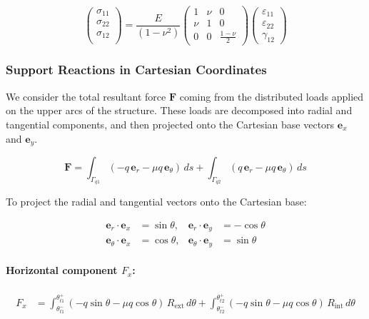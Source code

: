\documentclass[12pt]{article}
\begin{document}
\begin{equation}
    \begin{pmatrix}
    \sigma_{11} \\
    \sigma_{22} \\
    \sigma_{12} \\
    \end{pmatrix}= \frac{E}{(1-\nu^2)}\begin{pmatrix}
    1 &  \nu & 0  \\
    \nu & 1 & 0 \\
    0 & 0 & \frac{1-\nu}{2} 
    \end{pmatrix}
    \begin{pmatrix}
    \varepsilon_{11} \\
    \varepsilon_{22} \\
    \gamma_{12}
    \end{pmatrix}
\end{equation}


\subsubsection{Support Reactions in Cartesian Coordinates}

We consider the total resultant force $\mathbf{F}$ coming from the distributed loads applied on the upper arcs of the structure. These loads are decomposed into radial and tangential components, and then projected onto the Cartesian base vectors $\mathbf{e}_x$ and $\mathbf{e}_y$.

\begin{equation}
\boxed{
\mathbf{F} =
\int_{\Gamma_{q1}} (-q\, \mathbf{e}_r - \mu q\, \mathbf{e}_\theta) \, ds
+
\int_{\Gamma_{q2}} (q\, \mathbf{e}_r - \mu q\, \mathbf{e}_\theta) \, ds
}
\end{equation}

To project the radial and tangential vectors onto the Cartesian base:

\begin{align*}
\mathbf{e}_r \cdot \mathbf{e}_x &= \sin\theta, &
\mathbf{e}_r \cdot \mathbf{e}_y &= -\cos\theta \\
\mathbf{e}_\theta \cdot \mathbf{e}_x &= \cos\theta, &
\mathbf{e}_\theta \cdot \mathbf{e}_y &= \sin\theta
\end{align*}

\paragraph{Horizontal component \( F_x \):}
\begin{align}
F_x &=
\int_{\theta_{t1}^-}^{\theta_{t1}^+} (-q \sin\theta - \mu q \cos\theta) \, R_{\text{ext}} \, d\theta
+
\int_{\theta_{t2}^-}^{\theta_{t2}^+} (-q \sin\theta - \mu q \cos\theta) \, R_{\text{int}} \, d\theta
\tag{2.25}
\end{align}
\end{document}
